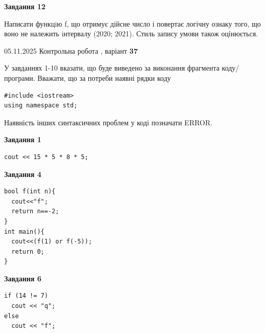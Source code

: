 \documentclass[12pt, ukrainian]{article}
\begin{document}
{\begin {large}
\begin{minipage}[t]{11.0cm}
\begin{center}
\textbf{Завдання 12}
\end{center}

Написати функцiю f, що отримує дійсне число і повертає логічну ознаку того, що воно не належить iнтервалу (2020; 2021). Стиль запису умови також оцінюється.\par

\end{minipage}

\end {large}}
\newpage

{\Large{05.11.2025 Контрольна робота , варіант  \No \textbf { 37 }\par}}
{
\begin {large}
У завданнях 1-10 вказати, що буде виведено за виконання фрагмента коду/про\-гра\-ми.
Вважати, що за потреби наявні рядки коду
\begin{verbatim}
#include <iostream>
using namespace std;
\end{verbatim}
Наявність інших синтаксичних проблем у коді позначати ERROR.

\begin{minipage}[t]{7.0cm}

\begin{center}
\textbf{Завдання 1}
\end{center}
\vspace{-8mm}

\begin{verbatim}
cout << 15 * 5 * 8 * 5;
\end{verbatim}



\begin{center}
\textbf{Завдання 4}
\end{center}
\vspace{-8mm}

\begin{verbatim}
bool f(int n){
  cout<<"f";
  return n==-2;
}
int main(){
  cout<<(f(1) or f(-5));
  return 0;
}
\end{verbatim}



\begin{center}
\textbf{Завдання 6}
\end{center}
\vspace{-8mm}

\begin{verbatim}
if (14 != 7)
  cout << "q";
else
  cout << "f";
\end{verbatim}




\end{minipage}
\end{large}}
\end{document}
